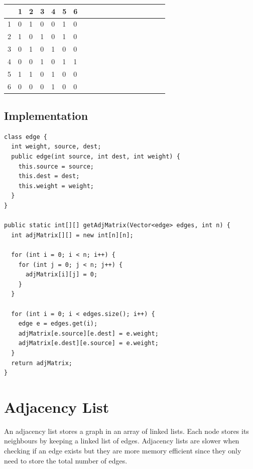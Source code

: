 \documentclass[11pt,oneside]{book}
\begin{document}
\begin{center}\begin{tabulary}{0.4\linewidth}{|l|l|l|l|l|l|l|l|l|l|l|l|l|l|l|l|l|l|l}\hline


   &
  1 &
  2 &
  3 &
  4 &
  5 &
  6\\
\hline


  1 &
  0 &
  1 &
  0 &
  0 &
  1 &
  0\\

  2 &
  1 &
  0 &
  1 &
  0 &
  1 &
  0\\

  3 &
  0 &
  1 &
  0 &
  1 &
  0 &
  0\\

  4 &
  0 &
  0 &
  1 &
  0 &
  1 &
  1\\

  5 &
  1 &
  1 &
  0 &
  1 &
  0 &
  0\\

  6 &
  0 &
  0 &
  0 &
  1 &
  0 &
  0\\

\hline\end{tabulary}\end{center}

\subsection{Implementation}

\begin{lstlisting}
class edge {
  int weight, source, dest;
  public edge(int source, int dest, int weight) {
    this.source = source;
    this.dest = dest;
    this.weight = weight;
  }
}

public static int[][] getAdjMatrix(Vector<edge> edges, int n) {
  int adjMatrix[][] = new int[n][n];

  for (int i = 0; i < n; i++) {
    for (int j = 0; j < n; j++) {
      adjMatrix[i][j] = 0;
    }
  }

  for (int i = 0; i < edges.size(); i++) {
    edge e = edges.get(i);
    adjMatrix[e.source][e.dest] = e.weight;
    adjMatrix[e.dest][e.source] = e.weight;
  }
  return adjMatrix;
}
\end{lstlisting}

        \section{ Adjacency List }
        

An adjacency list stores a graph in an array of linked lists. Each node stores its neighbours by keeping a linked list of edges. Adjacency lists are slower when checking if an edge exists but they are more memory efficient since they only need to store the total number of edges.
\end{document}
